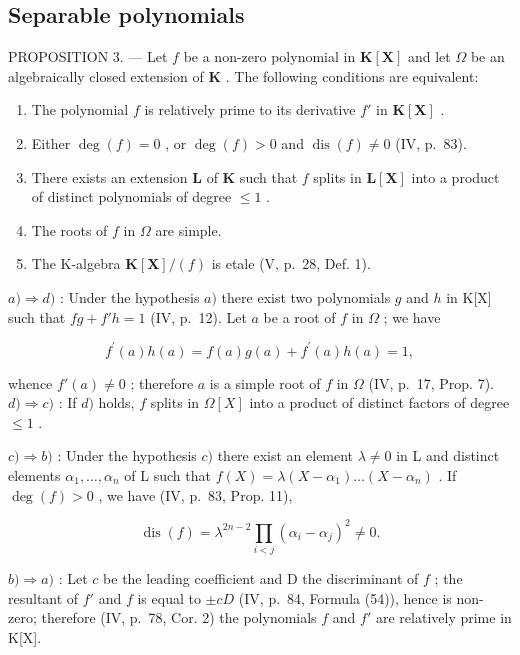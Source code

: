 \subsection{Separable polynomials}

PROPOSITION 3. --- Let \(f\) be a non-zero polynomial in \(\mathbf{K}[\mathbf{X}]\) and let \(\Omega\) be an algebraically closed extension of \(\mathbf{K}\) . The following conditions are equivalent:

\begin{enumerate}
\def\labelenumi{\alph{enumi})}
\item
  The polynomial \(f\) is relatively prime to its derivative \(f'\) in \(\mathbf{K}[\mathbf{X}]\) .
\item
  Either \(\deg(f) = 0\) , or \(\deg(f) > 0\) and \(\operatorname{dis}(f) \neq 0\) (IV, p.~83).
\item
  There exists an extension \(\mathbf{L}\) of \(\mathbf{K}\) such that \(f\) splits in \(\mathbf{L}[\mathbf{X}]\) into a product of distinct polynomials of degree \(\leqslant 1\) .
\item
  The roots of \(f\) in \(\Omega\) are simple.
\item
  The K-algebra \(\mathbf{K}[\mathbf{X}] / (f)\) is etale (V, p.~28, Def. 1).
\end{enumerate}

\(a) \Rightarrow d)\) : Under the hypothesis \(a)\) there exist two polynomials \(g\) and \(h\) in K{[}X{]} such that \(fg + f'h = 1\) (IV, p.~12). Let \(a\) be a root of \(f\) in \(\Omega\) ; we have

\[
f ^ {\prime} (a) h (a) = f (a) g (a) + f ^ {\prime} (a) h (a) = 1,
\]

whence \(f'(a) \neq 0\) ; therefore \(a\) is a simple root of \(f\) in \(\Omega\) (IV, p.~17, Prop. 7). \(d) \Rightarrow c)\) : If \(d)\) holds, \(f\) splits in \(\Omega[X]\) into a product of distinct factors of degree \(\leqslant 1\) .

\(c) \Rightarrow b)\) : Under the hypothesis \(c)\) there exist an element \(\lambda \neq 0\) in L and distinct elements \(\alpha_{1}, \ldots, \alpha_{n}\) of L such that \(f(X) = \lambda(X - \alpha_{1}) \ldots (X - \alpha_{n})\) . If \(\deg(f) > 0\) , we have (IV, p.~83, Prop. 11),

\[
\operatorname{dis} (f) = \lambda^ {2 n - 2} \prod_ {i <   j} (\alpha_ {i} - \alpha_ {j}) ^ {2} \neq 0.
\]

\(b) \Rightarrow a)\) : Let \(c\) be the leading coefficient and D the discriminant of \(f\) ; the resultant of \(f'\) and \(f\) is equal to \(\pm cD\) (IV, p.~84, Formula (54)), hence is non-zero; therefore (IV, p.~78, Cor. 2) the polynomials \(f\) and \(f'\) are relatively prime in K{[}X{]}.

